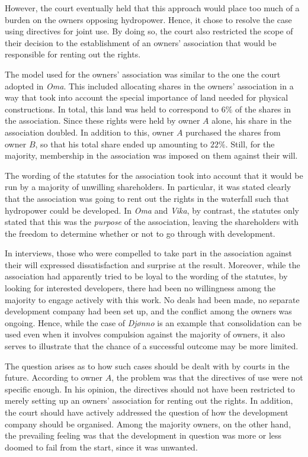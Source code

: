 However, the court eventually held that this approach would place too much of a burden on the owners opposing hydropower. Hence, it chose to resolve the case using directives for joint use. By doing so, the court also restricted the scope of their decision to the establishment of an owners' association that would be responsible for renting out the rights. 

The model used for the owners' association was similar to the one the court adopted in \emph{Oma}. This included allocating shares in the owners' association in a way that took into account the special importance of land needed for physical constructions. In total, this land was held to correspond to $6 \%$ of the shares in the association. Since these rights were held by owner $A$ alone, his share in the association doubled. In addition to this, owner $A$ purchased the shares from owner $B$, so that his total share ended up amounting to $22 \%$. Still, for the majority, membership in the association was imposed on them against their will.

The wording of the statutes for the association took into account that it would be run by a majority of unwilling shareholders. In particular, it was stated clearly that the association was going to rent out the rights in the waterfall such that hydropower could be developed. In \emph{Oma} and \emph{Vika}, by contrast, the statutes only stated that this was the \emph{purpose} of the association, leaving the shareholders with the freedom to determine whether or not to go through with development.

In interviews, those who were compelled to take part in the association against their will expressed dissatisfaction and surprise at the result. Moreover, while the association had apparently tried to be loyal to the wording of the statutes, by looking for interested developers, there had been no willingness among the majority to engage actively with this work. No deals had been made, no separate development company had been set up, and the conflict among the owners was ongoing. Hence, while the case of \emph{Djønno} is an example that consolidation can be used even when it involves compulsion against the majority of owners, it also serves to illustrate that the chance of a successful outcome may be more limited. 

The question arises as to how such cases should be dealt with by courts in the future. According to owner $A$, the problem was that the directives of use were not specific enough. In his opinion, the directives should not have been restricted to merely setting up an owners' association for renting out the rights. In addition, the court should have actively addressed the question of how the development company should be organised. Among the majority owners, on the other hand, the prevailing feeling was that the development in question was more or less doomed to fail from the start, since it was unwanted.

